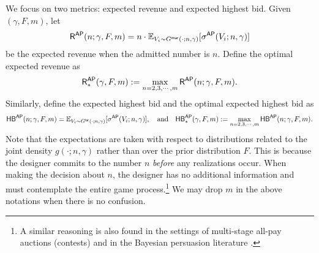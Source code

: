 We focus on two metrics: expected revenue and expected highest bid.  
Given $(\gamma,F,m)$, let 
\begin{align}
\label{eq:rev_n_allpay}
 \mathsf{R}^{\mathsf{AP}}(n;\gamma,F,m) = n\cdot \mathbb{E}_{V_i\sim G^{\mathsf{mar}}(\cdot ; n,\gamma)}[\sigma^{\mathsf{AP}}(V_i;n,\gamma)]
\end{align}
be the expected revenue when the admitted number is $n$.
Define the optimal expected revenue as
\begin{align*}
  \mathsf{R}_\ast^{\mathsf{AP}}(\gamma,F,m) := \max_{n=2,3,\cdots,m} \mathsf{R}^{\mathsf{AP}}(n;\gamma,F,m).
\end{align*}
Similarly, define the expected highest bid and the optimal expected highest bid as
\begin{align*}
\mathsf{HB}^{\mathsf{AP}}(n;\gamma,F,m) = \mathbb{E}_{V_i\sim G^{\mathsf{lar}}(\cdot ;n,\gamma)}[\sigma^{\mathsf{AP}}(V_i;n,\gamma)],
\quad \textrm{and}
\quad 
 \mathsf{HB}_\ast^{\mathsf{AP}}(\gamma,F,m) := \max_{n=2,3,\cdots,m} \mathsf{HB}^{\mathsf{AP}}(n;\gamma,F,m).
\end{align*}
Note that the expectations
are taken with respect to distributions related to the joint density $g(\cdot;n,\gamma)$ rather than over the prior distribution $F$. This is because the designer commits to the number $n$ \textit{before} any realizations occur. When making the decision about $n$, the designer has no additional information and must contemplate the entire game process.\footnote{A similar reasoning is also found in the settings of multi-stage all-pay auctions (contests) \citep{moldovanu_2006_contest_architecture} and in the Bayesian persuasion literature \citep{kamenica_2011_persuasion}.}
We may drop $m$ in the above notations when there is no confusion.



